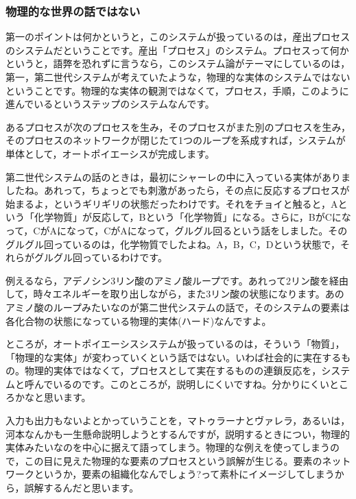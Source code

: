 \documentclass{ltjsbook}
\begin{document}
\subsubsection{物理的な世界の話ではない}

第一のポイントは何かというと，このシステムが扱っているのは，産出プロセスのシステムだということです。産出「プロセス」のシステム。プロセスって何かというと，語弊を恐れずに言うなら，このシステム論がテーマにしているのは，第一，第二世代システムが考えていたような，物理的な実体のシステムではないということです。物理的な実体の観測ではなくて，プロセス，手順，このように進んでいるというステップのシステムなんです。

あるプロセスが次のプロセスを生み，そのプロセスがまた別のプロセスを生み，そのプロセスのネットワークが閉じたて1つのループを系成すれば，システムが単体として，オートポイエーシスが完成します。

第二世代システムの話のときは，最初にシャーレの中に入っている実体がありましたね。あれって，ちょっとでも刺激があったら，その点に反応するプロセスが始まるよ，というギリギリの状態だったわけです。それをチョイと触ると，Aという「化学物質」が反応して，Bという「化学物質」になる。さらに，BがCになって，CがAになって，CがAになって，グルグル回るという話をしました。そのグルグル回っているのは，化学物質でしたよね。A，B，C，Dという状態で，それらがグルグル回っているわけです。

例えるなら，アデノシン3リン酸のアミノ酸ループです。あれって2リン酸を経由して，時々エネルギーを取り出しながら，また3リン酸の状態になります。あのアミノ酸のループみたいなのが第二世代システムの話で，そのシステムの要素は各化合物の状態になっている物理的実体(ハード)なんですよ。

ところが，オートポイエーシスシステムが扱っているのは，そういう「物質」，「物理的な実体」が変わっていくという話ではない。いわば社会的に実在するもの。物理的実体ではなくて，プロセスとして実在するものの連鎖反応を，システムと呼んでいるのです。このところが，説明しにくいですね。分かりにくいところかなと思います。

入力も出力もないよとかっていうことを，マトゥラーナとヴァレラ，あるいは，河本なんかも一生懸命説明しようとするんですが，説明するときについ，物理的実体みたいなのを中心に据えて語ってしまう。物理的な例えを使ってしまうので，この目に見えた物理的な要素のプロセスという誤解が生じる。要素のネットワークというか，要素の組織化なんでしょう?って素朴にイメージしてしまうから，誤解するんだと思います。
\end{document}

